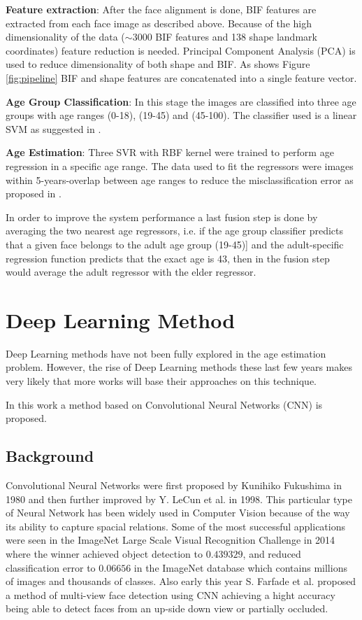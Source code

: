 \textbf{Feature extraction}: 
After the face alignment is done, BIF features are extracted from each face image as described above. Because of the high dimensionality of the data ($\sim3000$ BIF features and 138 shape landmark coordinates) feature reduction is needed. Principal Component Analysis (PCA) is used to reduce dimensionality of both shape and BIF. As shows Figure \ref{fig:pipeline} BIF and shape features are concatenated into a single feature vector.

\textbf{Age Group Classification}:
In this stage the images are classified into three age groups with age ranges (0-18), (19-45) and (45-100). The classifier used is a linear SVM as suggested in \cite{4531189}.

\textbf{Age Estimation}:
Three SVR with RBF kernel were trained to perform age regression in a specific age range. The data used to fit the regressors were images within 5-years-overlap between age ranges to reduce the misclassification error as proposed in \cite{han:age}. 

In order to improve the system performance a last fusion step is done by averaging the two nearest age regressors, i.e. if the age group classifier predicts that a given face belongs to the adult age group (19-45)] and the adult-specific regression function predicts that the exact age is 43, then in the fusion step would average the adult regressor with the elder regressor.


\section{Deep Learning Method}

Deep Learning methods have not been fully explored in the age estimation problem. However, the rise of Deep Learning methods these last few years makes very likely that more works will base their approaches on this technique.

In this work a method based on Convolutional Neural Networks (CNN) is proposed.

\subsection{Background}
Convolutional Neural Networks were first proposed by Kunihiko Fukushima \cite{fukushima:neocognitronbc} in 1980 and then further improved by Y. LeCun et al. \cite{Lecun98gradient-basedlearning} in 1998. This particular type of Neural Network has been widely used in Computer Vision because of the way its ability to capture spacial relations. Some of the most successful applications were seen in the ImageNet Large Scale Visual Recognition Challenge \cite{DBLP:journals/corr/RussakovskyDSKSMHKKBBF14} in 2014 where the winner \cite{DBLP:journals/corr/SzegedyLJSRAEVR14} achieved object detection to $0.439329$, and reduced classification error to $0.06656$ in the ImageNet database which contains millions of images and thousands of classes. Also early this year S. Farfade et al. \cite{DBLP:journals/corr/FarfadeSL15} proposed a method of multi-view face detection using CNN achieving a hight accuracy being able to detect faces from an up-side down view or partially occluded.

